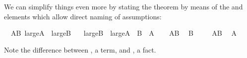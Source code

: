 \begin{isabellebody}
\begin{isamarkuptext}
We can simplify things even more by stating the theorem by means of the
 and  elements which allow direct
naming of assumptions:%
\end{isamarkuptext}%
\isamarkupfalse%
\ \ AB{\isacharcolon}\ {\isachardoublequote}large{\isacharunderscore}A\ {\isasymand}\ large{\isacharunderscore}B{\isachardoublequote}\isanewline
\ \ \ {\isachardoublequote}large{\isacharunderscore}B\ {\isasymand}\ large{\isacharunderscore}A{\isachardoublequote}\ {\isacharparenleft}\ {\isachardoublequote}{\isacharquery}B\ {\isasymand}\ {\isacharquery}A{\isachardoublequote}{\isacharparenright}\isanewline
%
\isadelimproof
%
\endisadelimproof
%
\isatagproof
\isamarkupfalse%
\isanewline
\ \ \isamarkupfalse%
\ AB\ \isamarkupfalse%
\ {\isachardoublequote}{\isacharquery}B{\isachardoublequote}\ \isamarkupfalse%
\isacommand{{\isachardot}{\isachardot}}\isanewline
\isamarkupfalse%
\isanewline
\ \ \isamarkupfalse%
\ AB\ \isamarkupfalse%
\ {\isachardoublequote}{\isacharquery}A{\isachardoublequote}\ \isamarkupfalse%
\isacommand{{\isachardot}{\isachardot}}\isanewline
\isamarkupfalse%
%
\endisatagproof
{\isafoldproof}%
%
\isadelimproof
%
\endisadelimproof
\isamarkuptrue%
%
\begin{isamarkuptext}%
\noindent Note the difference between , a term, and
, a fact.


\end{isamarkuptext}
\end{isabellebody}
